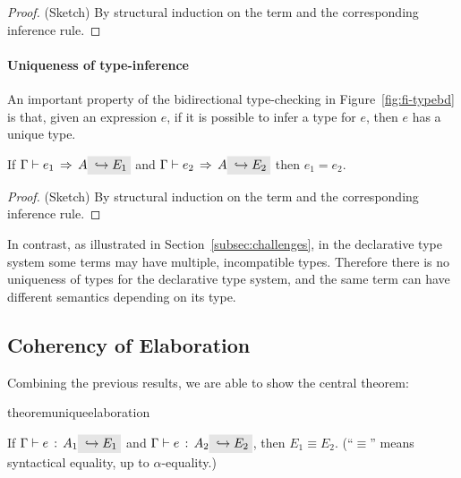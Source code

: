 \begin{proof}
  (Sketch) By structural induction on the term and the corresponding
  inference rule.
\end{proof}

\paragraph{Uniqueness of type-inference} An important property of the
bidirectional type-checking in Figure~\ref{fig:fi-typebd} is that, given an expression $e$, if it is
possible to infer a type for $e$, then $e$ has a unique type.

\begin{theorem}
\label{theorem:uniqueness-type-inference}
If $\jinfer \Gamma {e_1} A \yields {E_1}$ and $\jinfer \Gamma {e_2} A \yields {E_2}$ then 
${e_1} = {e_2}$.
\end{theorem}

\begin{proof}
  (Sketch) By structural induction on the term and the corresponding
  inference rule.
\end{proof}

In contrast, as illustrated in Section~\ref{subsec:challenges}, in the declarative type
system some terms may have multiple, incompatible types. Therefore
there is no uniqueness of types for the declarative type system, and
the same term can have different semantics depending on its type.

\subsection{Coherency of Elaboration}

Combining the previous results, we are able to show the central theorem:

\begin{restatable}{theorem}{uniqueelaboration}
  \label{theorem:unique-elaboration}

  If $\jtype \Gamma e {A_1} \yields {E_1}$ and $\jtype \Gamma e {A_2} \yields
  {E_2}$, then $E_1 \equiv E_2$. (``$\equiv$'' means syntactical equality, up to
  $\alpha$-equality.)

\end{restatable}


